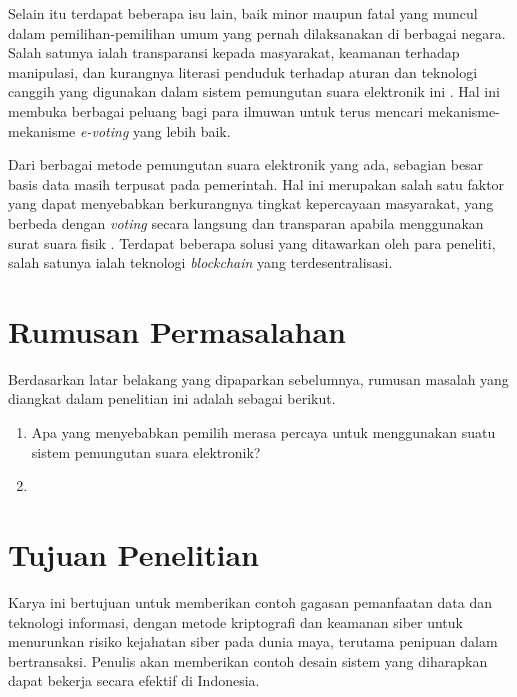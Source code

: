 Selain itu terdapat beberapa isu lain, baik minor maupun fatal yang muncul dalam pemilihan-pemilihan umum yang pernah dilaksanakan di berbagai negara. Salah satunya ialah transparansi kepada masyarakat, keamanan terhadap manipulasi, dan kurangnya literasi penduduk terhadap aturan dan teknologi canggih yang digunakan dalam sistem pemungutan suara elektronik ini \citep{7001136}. Hal ini membuka berbagai peluang bagi para ilmuwan untuk terus mencari mekanisme-mekanisme \textit{e-voting} yang lebih baik.

Dari berbagai metode pemungutan suara elektronik yang ada, sebagian besar basis data masih terpusat pada pemerintah. Hal ini merupakan salah satu faktor yang dapat menyebabkan berkurangnya tingkat kepercayaan masyarakat, yang berbeda dengan \textit{voting} secara langsung dan transparan apabila menggunakan surat suara fisik \citep{8651451}. Terdapat beberapa solusi yang ditawarkan oleh para peneliti, salah satunya ialah teknologi \textit{blockchain} yang terdesentralisasi.

\section{Rumusan Permasalahan}
Berdasarkan latar belakang yang dipaparkan sebelumnya, rumusan masalah yang diangkat dalam penelitian ini adalah sebagai berikut.

\begin{enumerate}
    \item Apa yang menyebabkan pemilih merasa percaya untuk menggunakan suatu sistem pemungutan suara elektronik?
    \item 
\end{enumerate}

\section{Tujuan Penelitian}
Karya ini bertujuan untuk memberikan contoh gagasan pemanfaatan data dan teknologi informasi, dengan metode kriptografi dan keamanan siber untuk menurunkan risiko kejahatan siber pada dunia maya, terutama penipuan dalam bertransaksi. Penulis akan memberikan contoh desain sistem yang diharapkan dapat bekerja secara efektif di Indonesia.

